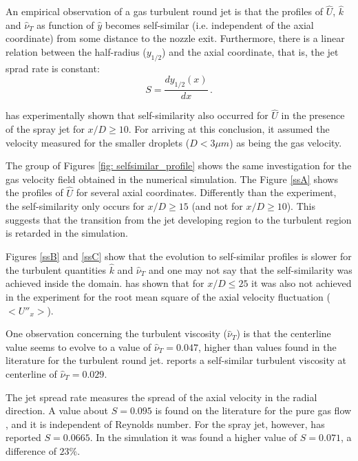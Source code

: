 \documentclass[preprint,12pt,review]{elsarticle}
\begin{document}
An empirical observation of a gas turbulent round jet is that the profiles of $\hat{U}$, $\hat{k}$ and $\hat{\nu}_T$ as function of $\hat{y}$ becomes self-similar (i.e. independent of the axial coordinate) from some distance to the nozzle exit.
Furthermore, there is a linear relation between the half-radius ($y_{1/2}$) and the axial coordinate, that is, the jet sprad rate is constant:
\begin{equation}
S = \frac{d y_{1/2} (x)}{dx} \, .
\end{equation}

\citet{chen} has experimentally shown that self-similarity also occurred for $\hat{U}$ in the presence of the spray jet for $x/D \ge 10$. For arriving at this conclusion, it assumed the velocity measured for the smaller droplets ($D<3\mu m$) as being the gas velocity. 

The group of Figures \ref{fig: selfsimilar_profile} shows the same investigation for the gas velocity field obtained in the numerical simulation. The Figure \ref{ssA} shows the profiles of $\hat{U}$ for several axial coordinates. Differently than the experiment, the self-similarity only occurs for $x/D \ge 15$ (and not for $x/D \ge 10$). This suggests that the transition from the jet developing region to the turbulent region is retarded in the simulation.

Figures \ref{ssB} and \ref{ssC} show that the evolution to self-similar profiles is slower for the turbulent quantities $\hat{k}$ and $\hat{\nu}_T$ and one may not say that the self-similarity was achieved inside the domain. \citet{chen} has shown that for $x/D \le 25$ it was also not achieved in the experiment for the root mean square of the axial velocity fluctuation ($<U''_x>$). 

One observation concerning the turbulent viscosity ($\hat{\nu}_T$) is that the centerline value seems to evolve to a value of $\hat{\nu}_T = 0.047$, higher than values found in the literature for the turbulent round jet. \citet{pope2000turbulent} reports a self-similar turbulent viscosity at centerline of $\hat{\nu}_T = 0.029$.

The jet spread rate measures the spread of the axial velocity in the radial direction. A value about $S=0.095$ is found on the literature for the pure gas flow \citet{pope2000turbulent}, and it is independent of Reynolds number. For the spray jet, however, \citet{chen} has reported $S=0.0665$. In the simulation it was found a higher value of $S=0.071$, a difference of $23\%$. 
\end{document}
